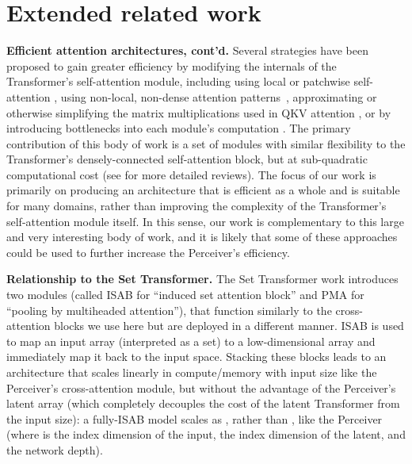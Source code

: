\documentclass{article}
\begin{document}



\clearpage

\appendix
\appendixpage

\section{Extended related work}
\label{sec:supp_related}

\noindent \textbf{Efficient attention architectures, cont'd.}
Several strategies have been proposed to gain greater efficiency by modifying the internals of the Transformer's self-attention module, including using local or patchwise self-attention \cite{parmar2018image, ramachandran2019standalone, zhao2020exploring, sukhbaatar2019adaptive}, using non-local, non-dense attention patterns~\cite{ho2019axial,wang2020axial, beltagy2020longformer, child2019generating, correia2019adaptively, ye2019bptransformer, roy2020efficient}, approximating or otherwise simplifying the matrix multiplications used in QKV attention \cite{choromanski2021rethinking, peng2021random, kitaev2020reformer, xiong2021nystromformer, katharopoulos2020transformers, tay2021synthesizer}, or by introducing bottlenecks into each module's computation \cite{lee2019set, wang2020linformer}. The primary contribution of this body of work is a set of modules with similar flexibility to the Transformer's densely-connected self-attention block, but at sub-quadratic computational cost (see \citealt{tay2020efficient, tay2020long} for more detailed reviews). The focus of our work is primarily on producing an architecture that is efficient as a whole and is suitable for many domains, rather than improving the complexity of the Transformer's self-attention module itself. In this sense, our work is complementary to this large and very interesting body of work, and it is likely that some of these approaches could be used to further increase the Perceiver's efficiency.

\noindent \textbf{Relationship to the Set Transformer.}
The Set Transformer work \cite{lee2019set} introduces two modules (called ISAB for ``induced set attention block'' and PMA for ``pooling by multiheaded attention''), that function similarly to the cross-attention blocks we use here but are deployed in a different manner. ISAB is used to map an input array (interpreted as a set) to a low-dimensional array and immediately map it back to the input space. Stacking these blocks leads to an architecture that scales linearly in compute/memory with input size like the Perceiver's cross-attention module, but without the advantage of the Perceiver's latent array (which completely decouples the cost of the latent Transformer from the input size): a fully-ISAB model scales as , rather than , like the Perceiver (where  is the index dimension of the input,  the index dimension of the latent, and  the network depth). 
\end{document}
